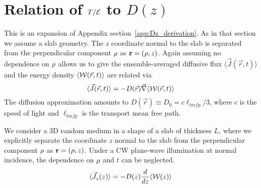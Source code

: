 \chapter{\texorpdfstring{Relation of $T/{\cal E}$}{T/E} to \texorpdfstring{$D(z)$}{D(z)}} %
\label{sec:appendix_TE_Dz_relation}


This is an expansion of Appendix section~\ref{app:Dz_derivation}. As in that section we assume a slab geometry. The $z$ coordinate normal to the slab is separated from the perpendicular component ${\bf \rho}$ as ${\bf r}=({\bf \rho},z)$. Again assuming no dependence on ${\bf \rho}$ allows us to give the ensemble-averaged diffusive flux $\langle\vec{J}(\vec{r},t)\rangle$ and the energy density $\langle {\cal W}(\vec{r},t)\rangle$ are related via \cite{1953_Morse}
\begin{equation}
\langle\vec{J}(\vec{r},t)\rangle=-D(\vec{r})\vec{\nabla}\langle {\cal W}(\vec{r},t)\rangle
\label{eq:Jflux_relation}
\end{equation}
The diffusion approximation amounts to $D(\vec{r})\equiv D_0=c\ell_{tmfp}/3$, where $c$ is the speed of light and $\ell_{tmfp}$ is the transport mean free path.

We consider a 3D random medium in a shape of a slab of thickness $L$, where we explicitly  separate the coordinate $z$ normal to the slab from the perpendicular component ${\bf \rho}$ as ${\bf r}=({\bf \rho},z)$. Under a CW plane-wave illumination at normal incidence, the dependence on ${\bf \rho}$ and $t$ can be neglected. 
\begin{equation}
\langle\vec{J}_z(z)\rangle=-D(z)\frac{d}{dz}\langle {\cal W}(z)\rangle
\end{equation}

